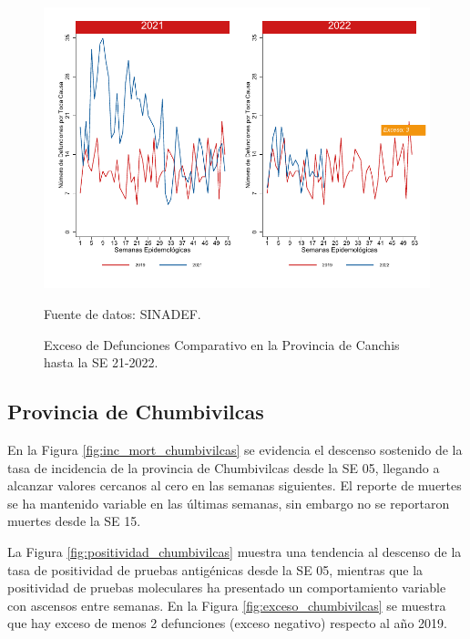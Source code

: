 \documentclass[12pt,a4paper,openany]{book}
\begin{document}
	\begin{figure}[h]
		\caption{Exceso de Defunciones Comparativo en la Provincia de Canchis hasta la SE 21-2022.}\label{fig:exceso_canchis}
		\begin{center}
			\includegraphics[width=0.7\linewidth]{../figuras/exceso_5.pdf}
		\end{center}
		{\footnotesize {Fuente de datos: SINADEF.}}
	\end{figure}
	
	\clearpage
	
	\subsection*{Provincia de Chumbivilcas}
	\noindent En la Figura \ref{fig:inc_mort_chumbivilcas} se evidencia el descenso sostenido de la tasa de incidencia de la provincia de Chumbivilcas desde la SE 05,  llegando a alcanzar valores cercanos al cero en las semanas siguientes. El reporte de muertes se ha mantenido variable en las últimas semanas, sin embargo no se reportaron muertes desde la SE 15.
	
	
	\noindent La Figura \ref{fig:positividad_chumbivilcas} muestra una tendencia al descenso de la tasa de positividad de pruebas antigénicas desde la SE 05, mientras que la positividad de pruebas moleculares ha presentado un comportamiento variable con ascensos entre semanas. En la Figura \ref{fig:exceso_chumbivilcas} se muestra que hay exceso de menos 2 defunciones (exceso negativo) respecto al año 2019.
	
\end{document}
